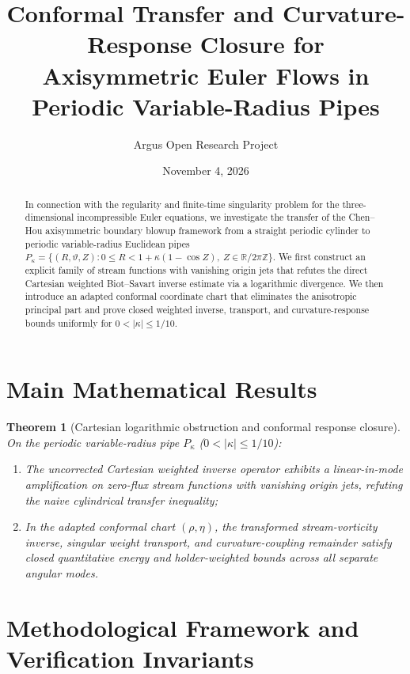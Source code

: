 \documentclass[10pt,reqno]{amsart}
\title[Conformal Transfer for Euler Flows in Curved Pipes]
{Conformal Transfer and Curvature-Response Closure for Axisymmetric Euler Flows in Periodic Variable-Radius Pipes}
\author{Argus Open Research Project}
\date{November 4, 2026}
\newtheorem{theorem}{Theorem}[section]
\theoremstyle{definition}
\begin{document}
\begin{abstract}
In connection with the regularity and finite-time singularity problem for the three-dimensional incompressible Euler equations, we investigate the transfer of the Chen--Hou axisymmetric boundary blowup framework from a straight periodic cylinder to periodic variable-radius Euclidean pipes $P_\kappa = \{(R,\vartheta,Z) : 0 \le R < 1+\kappa(1-\cos Z),\ Z \in \mathbb{R}/2\pi\mathbb{Z}\}$. We first construct an explicit family of stream functions with vanishing origin jets that refutes the direct Cartesian weighted Biot--Savart inverse estimate via a logarithmic divergence. We then introduce an adapted conformal coordinate chart that eliminates the anisotropic principal part and prove closed weighted inverse, transport, and curvature-response bounds uniformly for $0 < |\kappa| \le 1/10$.
\end{abstract}
\maketitle

\section{Main Mathematical Results}
\begin{theorem}[Cartesian logarithmic obstruction and conformal response closure]
On the periodic variable-radius pipe $P_\kappa$ ($0 < |\kappa| \le 1/10$):
\begin{enumerate}[label=\textup{(\arabic*)}]
  \item The uncorrected Cartesian weighted inverse operator exhibits a linear-in-mode amplification on zero-flux stream functions with vanishing origin jets, refuting the naive cylindrical transfer inequality;
  \item In the adapted conformal chart $(\rho,\eta)$, the transformed stream-vorticity inverse, singular weight transport, and curvature-coupling remainder satisfy closed quantitative energy and holder-weighted bounds across all separate angular modes.
\end{enumerate}
\end{theorem}

\section{Methodological Framework and Verification Invariants}
\end{document}
